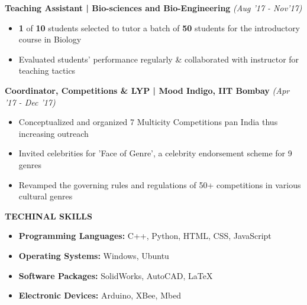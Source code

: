 \documentclass[11pt]{article}%
\begin{document}
\vspace{-0.4cm}
{\flushleft \bf \large{Teaching Assistant | Bio-sciences and Bio-Engineering}} \hfill {{{\em {(Aug '17 - Nov'17)}}}}
\begin{itemize}
\setlength\itemsep{0.015em}
\vspace{-0.2cm}
\item \textbf{1} of \textbf{10} students selected to tutor a batch of \textbf{50} students for the introductory course in Biology
\item Evaluated students' performance regularly & collaborated with instructor for teaching tactics
\end{itemize}
\vspace{-1mm}





\vspace{-0.4cm}
{\flushleft \bf \large{Coordinator, Competitions \& LYP | Mood Indigo, IIT Bombay}} \hfill {{{\em {(Apr '17 - Dec '17)}}}}
\begin{itemize}
\setlength\itemsep{0.01em}
\vspace{-0.2cm}
\item Conceptualized and organized 7 Multicity Competitions pan India thus increasing outreach
\item Invited celebrities for 'Face of Genre', a celebrity endorsement scheme for 9 genres
\item Revamped the governing rules and regulations of 50+ competitions in various cultural genres
\end{itemize}

\vspace{-0.4cm}










\begin{flushleft}
\bf{\LARGE{T}\Large{ECHINAL} \LARGE{S}\Large{KILLS}}
\end{flushleft}
\vspace{-2mm}
\hline

\begin{itemize}
    \setlength\itemsep{0.01em}
    \item \textbf{Programming Languages:} C++, Python, HTML, CSS, JavaScript
    \item \textbf{Operating Systems:} Windows, Ubuntu
    \item \textbf{Software Packages:}  SolidWorks, AutoCAD, \LaTeX 
    \item \textbf{Electronic Devices:} Arduino, XBee, Mbed
\end{itemize}
\end{document}
